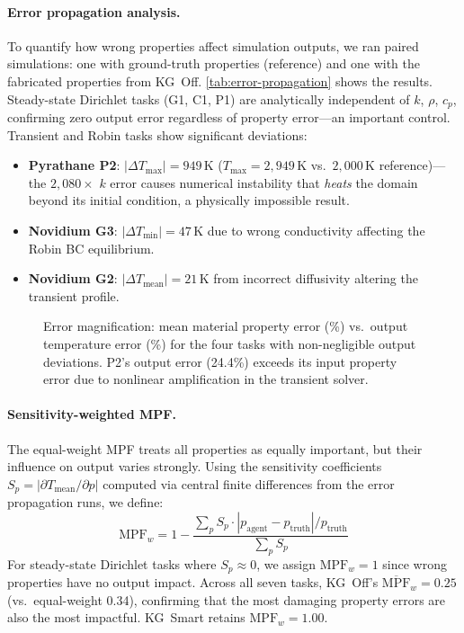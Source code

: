 \documentclass[twocolumn]{article}
\begin{document}
\paragraph{Error propagation analysis.}
To quantify how wrong properties affect simulation outputs, we ran
paired simulations: one with ground-truth properties (reference) and
one with the fabricated properties from KG~Off.  \cref{tab:error-propagation}
shows the results.  Steady-state Dirichlet tasks (G1, C1, P1) are
analytically independent of $k$, $\rho$, $c_p$, confirming zero output
error regardless of property error---an important control.  Transient
and Robin tasks show significant deviations:

\begin{itemize}
  \item \textbf{Pyrathane P2}: $|\Delta T_{\max}|{=}949$\,K
        ($T_{\max}{=}2{,}949$\,K vs.\ $2{,}000$\,K reference)---the
        $2{,}080\times$ $k$ error causes numerical instability that
        \emph{heats} the domain beyond its initial condition, a
        physically impossible result.
  \item \textbf{Novidium G3}: $|\Delta T_{\min}|{=}47$\,K due to
        wrong conductivity affecting the Robin BC equilibrium.
  \item \textbf{Novidium G2}: $|\Delta T_{\text{mean}}|{=}21$\,K
        from incorrect diffusivity altering the transient profile.
\end{itemize}



\begin{figure}[htbp]
  \centering
  
  \caption{Error magnification: mean material property error (\%)
    vs.\ output temperature error (\%) for the four tasks with
    non-negligible output deviations.  P2's output error (24.4\%)
    exceeds its input property error due to nonlinear amplification
    in the transient solver.}
  \label{fig:error-mag}
\end{figure}

\paragraph{Sensitivity-weighted MPF.}
The equal-weight MPF treats all properties as equally important, but
their influence on output varies strongly.  Using the sensitivity
coefficients $S_p = |\partial T_{\text{mean}} / \partial p|$ computed
via central finite differences from the error propagation runs, we
define:
\begin{equation}
\text{MPF}_w = 1 - \frac{\sum_{p} S_p \cdot |p_\text{agent} - p_\text{truth}| / p_\text{truth}}{\sum_{p} S_p}
\end{equation}
For steady-state Dirichlet tasks where $S_p \approx 0$, we assign
$\text{MPF}_w{=}1$ since wrong properties have no output impact.
Across all seven tasks, KG~Off's $\overline{\text{MPF}}_w{=}0.25$
(vs.\ equal-weight 0.34), confirming that the most damaging property
errors are also the most impactful.  KG~Smart retains $\text{MPF}_w{=}1.00$.
\end{document}
